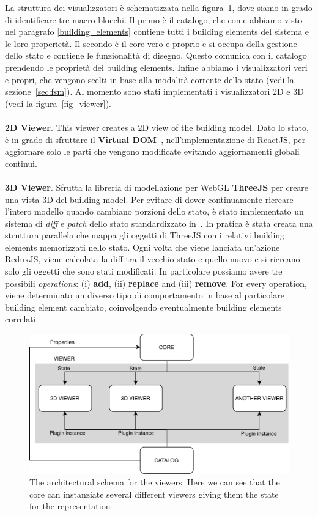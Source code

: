 La struttura dei visualizzatori \`e schematizzata nella figura~\ref{fig_viewers}, dove siamo in grado di identificare tre macro blocchi. Il primo \`e il catalogo, che come abbiamo visto nel paragrafo \ref{building_elements} contiene tutti i building elements del sistema e le loro properiet\`a. Il secondo \`e il core vero e proprio e si occupa della gestione dello stato e contiene le funzionalit\`a di disegno. Questo comunica con il catalogo prendendo le propriet\`a dei building elements. Infine abbiamo i visualizzatori veri e propri, che vengono scelti in base alla modalit\`a corrente dello stato (vedi la sezione~\ref{sec:fsm}). Al momento sono stati implementati i visualizzatori 2D e 3D (vedi la figura~\ref{fig_viewer}).\\\\
\textbf{2D Viewer}. This viewer creates a 2D view of the building model. Dato lo stato, \`e in grado di sfruttare il \textbf{Virtual DOM}~\cite{Voutilainen2016}, nell'implementazione di ReactJS, per aggiornare solo le parti che vengono modificate evitando aggiornamenti globali continui.\\\\
\textbf{3D Viewer}. Sfrutta la libreria di modellazione per WebGL \textbf{ThreeJS} per creare una vista 3D del building model. Per evitare di dover continuamente ricreare l'intero modello quando cambiano porzioni dello stato, \`e stato implementato un sistema di \textit{diff} e \textit{patch} dello stato standardizzato in~\cite{rfc6902}. In pratica \`e stata creata una struttura parallela che mappa gli oggetti di ThreeJS con i relativi building elements memorizzati nello stato. Ogni volta che viene lanciata un'azione ReduxJS, viene calcolata la diff tra il vecchio stato e quello nuovo e si ricreano solo gli oggetti che sono stati modificati. In particolare possiamo avere tre possibili \textit{operations}: (i) \textbf{add}, (ii) \textbf{replace} and (iii) \textbf{remove}. For every operation, viene determinato un diverso tipo di comportamento in base al particolare building element cambiato, coinvolgendo eventualmente building elements correlati



\begin{figure}[htb]
\centering
\includegraphics[width=\linewidth]{contents/images/diagramma-visualizzatori}

\caption{The architectural schema for the viewers. Here we can see that the core can instanziate several different viewers giving them the state for the representation}
\label{fig_viewers}
\end{figure}

